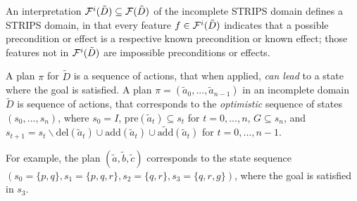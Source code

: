 \documentclass{article}
\newtheorem{theorem}{Theorem}[section]
\begin{document}
%
An interpretation ${\cal F}^i(\tilde{D}) \subseteq {\cal F}(\tilde{D})$ of the incomplete STRIPS domain defines a STRIPS domain, in that every feature $f \in {\cal F}^i(\tilde{D})$ indicates that a possible precondition or effect is a respective known precondition or known effect; those features not in ${\cal F}^i(\tilde{D})$ are impossible preconditions or effects.

A plan $\pi$ for $\tilde{D}$ is a sequence of actions, that when applied, {\em can lead} to a state where the goal is satisfied.  A plan $\pi = (\tilde{a}_0, ..., \tilde{a}_{n-1})$ in an incomplete domain $\tilde{D}$ is sequence of actions, that corresponds to the {\em optimistic} sequence of states $(s_0, ..., s_n)$, where $s_0 = I$, $\text{pre}(\tilde{a}_t) \subseteq s_t$ for $t = 0,..., n$, $G \subseteq s_n$, and $s_{t+1} = s_t \backslash \text{del}(\tilde{a}_t) \cup \text{add}(\tilde{a}_t) \cup \widetilde{\text{add}}(\tilde{a}_t)$ for $t = 0,..., n-1$.  

For example, the plan $(\tilde{a}, \tilde{b}, \tilde{c})$ corresponds to the state sequence $(s_0 = \{p, q\}, s_1 = \{p, q, r\}, s_2 = \{q, r\}, s_3 = \{q, r, g\})$, where the goal is satisfied in $s_3$.  

%
%
%
\end{document}
